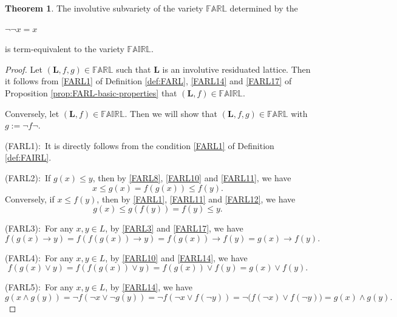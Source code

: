 \documentclass[final,12pt,times]{elsarticle}
\theoremstyle{plain}
\theoremstyle{definition}
\newtheorem{theorem}[definition]{Theorem}
\theoremstyle{break}
\newcommand{\FARL}{\mathbb{FARL}}
\newcommand{\FAIRL}{\mathbb{FAIRL}}
\begin{document}
\begin{theorem} \label{thm:FAIRL}
The involutive subvariety of the variety $\FARL$ determined by the
\begin{center} $\neg\neg x=x$
\end{center}
is term-equivalent to the variety $\FAIRL$.  
\end{theorem}
\begin{proof}
Let  $(\mathbf{L},f,g)\in \FARL$ such that $\mathbf{L}$ is an involutive residuated lattice. Then it follows from \eqref{FARL1} of Definition \ref{def:FARL}, \eqref{FARL14} and \eqref{FARL17} of Proposition \ref{prop:FARL-basic-properties} that  $(\mathbf{L},f)\in\FAIRL$.


Conversely, let $(\mathbf{L},f)\in\FAIRL$. Then we will show that $(\mathbf{L},f,g)\in \FARL$ with $g:=\neg f\neg$. 

(FARL1):\ It is directly follows from the condition \eqref{FARL1} of Definition \ref{def:FAIRL}.


(FARL2):\ If $g(x)\le y$, then by \ref{FARL8}, \ref{FARL10} and \ref{FARL11}, we have
\[
 x\le g(x)=f(g(x))\le f(y).
\]
Conversely, if $x\le f(y)$, then by \eqref{FARL1}, \ref{FARL11} and \ref{FARL12}, we have
\[
 g(x)\le g(f(y))= f(y)\leq y.
\]

(FARL3):\ For any $x,y\in L$, by \eqref{FARL3} and \eqref{FARL17}, we have
\[f(g(x)\rightarrow y)=f(f(g(x))\rightarrow y)= f(g(x))\rightarrow f(y)=g(x)\rightarrow f(y).    
\] 

(FARL4):\ For any $x,y\in L$, by \ref{FARL10} and \eqref{FARL14}, we have
\[f(g(x)\vee y)=f(f(g(x))\vee y)=f(g(x))\vee f(y)=g(x)\vee f(y).
\]

(FARL5):\ For any $x,y\in L$, by \eqref{FARL14}, we have
\[
 g(x\wedge g(y))=\neg f(\neg x\vee\neg g(y))=\neg f(\neg x\vee f(\neg y))=\neg\bigl(f(\neg x)\vee f(\neg y)\bigr)=g(x)\wedge g(y).
\]
\end{proof}
\end{document}
